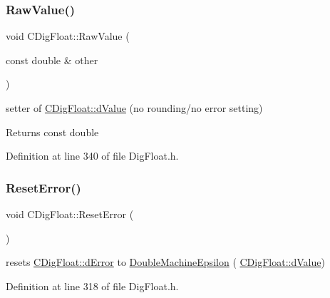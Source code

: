 \subsubsection{\texorpdfstring{Raw\+Value()}{RawValue()}\hspace{0.1cm}{\footnotesize\ttfamily [2/2]}}
{\footnotesize\ttfamily void C\+Dig\+Float\+::\+Raw\+Value (\begin{DoxyParamCaption}\item[{const double \&}]{other }\end{DoxyParamCaption})\hspace{0.3cm}{\ttfamily [inline]}}



setter of \hyperlink{classCDigFloat_a4bbe69e30dd4e20527362493aa9aaf96}{C\+Dig\+Float\+::d\+Value} (no rounding/no error setting) 

\begin{DoxyReturn}{Returns}
const double 
\end{DoxyReturn}


Definition at line 340 of file Dig\+Float.\+h.

\mbox{\label{classCDigFloat_a47dd744a2100dc850ede1511e616ed39}} 
\subsubsection{\texorpdfstring{Reset\+Error()}{ResetError()}}
{\footnotesize\ttfamily void C\+Dig\+Float\+::\+Reset\+Error (\begin{DoxyParamCaption}{ }\end{DoxyParamCaption})\hspace{0.3cm}{\ttfamily [inline]}}



resets \hyperlink{classCDigFloat_a25eb3782d1e727ff007a48f8308e3d4d}{C\+Dig\+Float\+::d\+Error} to \hyperlink{Utils_8h_adb19ed17b4e8ed0a8525c35fdc8872c3}{Double\+Machine\+Epsilon} ( \hyperlink{classCDigFloat_a4bbe69e30dd4e20527362493aa9aaf96}{C\+Dig\+Float\+::d\+Value}) 



Definition at line 318 of file Dig\+Float.\+h.

\mbox{\label{classCDigFloat_aab339f7e1ffa5c88f3dbb432389752c9}} 
